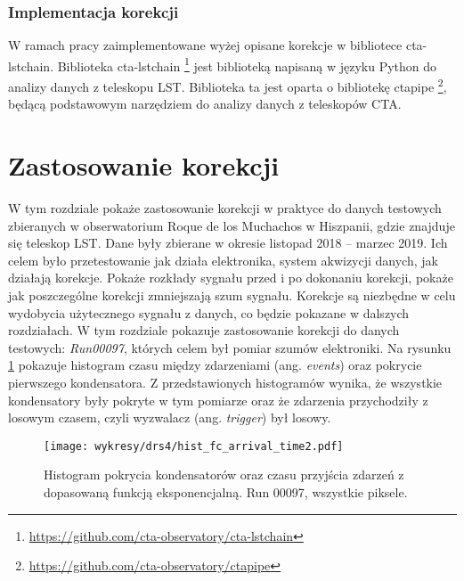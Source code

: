 \documentclass[a4paper,11pt,twoside]{article}
\begin{document}
\subsubsection{Implementacja korekcji}
W ramach pracy zaimplementowane wyżej opisane korekcje w bibliotece cta-lstchain. Biblioteka cta-lstchain  \footnote{\url{https://github.com/cta-observatory/cta-lstchain}} jest biblioteką napisaną w języku Python do analizy danych z teleskopu LST. Biblioteka ta jest oparta o bibliotekę ctapipe \footnote{\url{https://github.com/cta-observatory/ctapipe}}, będącą podstawowym narzędziem do analizy danych z teleskopów CTA.


\newpage
\section{Zastosowanie korekcji}
W tym rozdziale pokaże zastosowanie korekcji w praktyce do danych testowych zbieranych w obserwatorium Roque de los Muchachos w Hiszpanii, gdzie znajduje się teleskop LST. Dane były zbierane w okresie listopad 2018 -- marzec 2019. Ich celem było przetestowanie jak działa elektronika, system akwizycji danych, jak działają korekcje. Pokaże rozkłady sygnału przed i po dokonaniu korekcji, pokaże jak poszczególne korekcji zmniejszają szum sygnału. Korekcje są niezbędne w celu wydobycia użytecznego sygnału z danych, co będzie pokazane w dalszych rozdziałach. W tym rozdziale pokazuje zastosowanie korekcji do danych testowych: \textsl{Run00097}, których celem był pomiar szumów elektroniki. Na rysunku \ref{fig:data_hist} pokazuje histogram czasu między zdarzeniami (ang. \textsl{events}) oraz pokrycie pierwszego kondensatora. Z przedstawionych histogramów wynika, że wszystkie kondensatory były pokryte w tym pomiarze oraz że zdarzenia przychodziły z losowym czasem, czyli wyzwalacz (ang. \textsl{trigger}) był losowy. 
\begin{figure}[H] 
\centering
\texttt{[image: wykresy/drs4/hist\_fc\_arrival\_time2.pdf]}
\caption{Histogram pokrycia kondensatorów oraz czasu przyjścia zdarzeń z dopasowaną funkcją eksponencjalną. Run 00097, wszystkie piksele.}
\label{fig:data_hist}
\end{figure}
\end{document}
